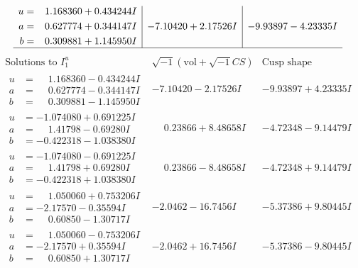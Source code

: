 \documentclass[1p]{elsarticle_modified}
\theoremstyle{definition}
\newcommand{\I}{\sqrt{-1}}
\begin{document}
$$\begin{array}{c|c|c}
\begin{aligned}
u &= \phantom{-}1.168360 + 0.434244 I \\
a &= \phantom{-}0.627774 + 0.344147 I \\
b &= \phantom{-}0.309881 + 1.145950 I\end{aligned}
 & -7.10420 + 2.17526 I & -9.93897 - 4.23335 I\\
 \hline 
 \end{array}$$\newpage$$\begin{array}{c|c|c}  
\text{Solutions to }I^u_{1}& \I (\text{vol} + \sqrt{-1}CS) & \text{Cusp shape}\\
 \hline 
\begin{aligned}
u &= \phantom{-}1.168360 - 0.434244 I \\
a &= \phantom{-}0.627774 - 0.344147 I \\
b &= \phantom{-}0.309881 - 1.145950 I\end{aligned}
 & -7.10420 - 2.17526 I & -9.93897 + 4.23335 I \\ \hline\begin{aligned}
u &= -1.074080 + 0.691225 I \\
a &= \phantom{-}1.41798 - 0.69280 I \\
b &= -0.422318 - 1.038380 I\end{aligned}
 & \phantom{-}0.23866 + 8.48658 I & -4.72348 - 9.14479 I \\ \hline\begin{aligned}
u &= -1.074080 - 0.691225 I \\
a &= \phantom{-}1.41798 + 0.69280 I \\
b &= -0.422318 + 1.038380 I\end{aligned}
 & \phantom{-}0.23866 - 8.48658 I & -4.72348 + 9.14479 I \\ \hline\begin{aligned}
u &= \phantom{-}1.050060 + 0.753206 I \\
a &= -2.17570 - 0.35594 I \\
b &= \phantom{-}0.60850 - 1.30717 I\end{aligned}
 & -2.0462 - 16.7456 I & -5.37386 + 9.80445 I \\ \hline\begin{aligned}
u &= \phantom{-}1.050060 - 0.753206 I \\
a &= -2.17570 + 0.35594 I \\
b &= \phantom{-}0.60850 + 1.30717 I\end{aligned}
 & -2.0462 + 16.7456 I & -5.37386 - 9.80445 I \\ \hline\begin{aligned}

\end{aligned}
\end{array}$$
\end{document}
